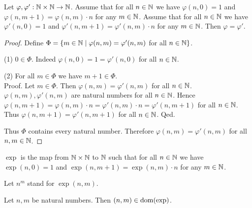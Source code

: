 \documentclass[../arithmetic.tex]{subfiles}
\begin{document}
  \begin{forthel}
    \begin{lemma}
      Let $\varphi, \varphi' : \mathbb{N} \times \mathbb{N} \to \mathbb{N}$.
      Assume that for all $n \in \mathbb{N}$ we have $\varphi(n, 0) = 1$ and
      $\varphi(n, m + 1) = \varphi(n,m) \cdot n$ for any $m \in \mathbb{N}$.
      Assume that for all $n \in \mathbb{N}$ we have $\varphi'(n, 0) = 1$ and
      $\varphi'(n, m + 1) = \varphi'(n,m) \cdot n$ for any $m \in \mathbb{N}$.
      Then $\varphi = \varphi'$.
    \end{lemma}
    \begin{proof}
      Define $\Phi = \{ m \in \mathbb{N} \mid \varphi(n,m) = \varphi'(n,m)$ for
      all $n \in \mathbb{N} \}$.

      (1) $0 \in \Phi$.
      Indeed $\varphi(n,0) = 1 = \varphi'(n,0)$ for all $n \in \mathbb{N}$.

      (2) For all $m \in \Phi$ we have $m + 1 \in \Phi$. \\
      Proof.
        Let $m \in \Phi$.
        Then $\varphi(n,m) = \varphi'(n,m)$ for all $n \in \mathbb{N}$.
        $\varphi(n,m), \varphi'(n,m)$ are natural numbers for all $n \in \mathbb{N}$. %
        Hence $\varphi(n, m + 1)
          = \varphi(n,m) \cdot n
          = \varphi'(n,m) \cdot n
          = \varphi'(n, m + 1)$
        for all $n \in \mathbb{N}$.
        Thus $\varphi(n,m + 1) = \varphi'(n,m + 1)$ for all $n \in \mathbb{N}$.
      Qed.

      Thus $\Phi$ contains every natural number.
      Therefore $\varphi(n,m) = \varphi'(n,m)$ for all $n, m \in \mathbb{N}$.
    \end{proof}
  \end{forthel}

  \begin{forthel}
    \begin{definition}
      $\exp$ is the map from $\mathbb{N} \times \mathbb{N}$ to $\mathbb{N}$ such that for all
      $n \in \mathbb{N}$ we have $\exp(n, 0) = 1$ and $\exp(n, m + 1) =
      \exp(n, m) \cdot n$ for any $m \in \mathbb{N}$.
    \end{definition}

    Let $n^{m}$ stand for $\exp(n,m)$.
  \end{forthel}

  \begin{forthel}
    \begin{lemma}
      Let $n, m$ be natural numbers.
      Then $(n,m) \in \operatorname{dom}(\operatorname{exp})$.
    \end{lemma}
  \end{forthel}
\end{document}
